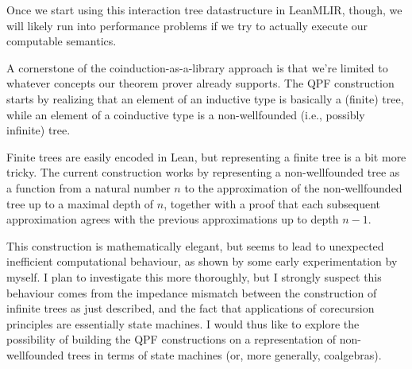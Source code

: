 \documentclass[a4paper]{scrartcl}
\begin{document}
Once we start using this interaction tree datastructure in LeanMLIR, though, 
we will likely run into performance problems if we try to actually execute our computable semantics.

A cornerstone of the coinduction-as-a-library approach is that we're
limited to whatever concepts our theorem prover already supports. The
QPF construction starts by realizing that an element of an inductive
type is basically a (finite) tree, while an element of a coinductive
type is a non-wellfounded (i.e., possibly infinite) tree.

Finite trees are easily encoded in Lean, but representing a finite tree
is a bit more tricky. The current construction works by representing a
non-wellfounded tree as a function from a natural number \(n\) to the
approximation of the non-wellfounded tree up to a maximal depth of
\(n\), together with a proof that each subsequent approximation agrees
with the previous approximations up to depth \(n-1\).

This construction is mathematically elegant, but seems to lead to
unexpected inefficient computational behaviour, as shown by some early
experimentation by myself. I plan to investigate this more thoroughly,
but I strongly suspect this behaviour comes from the impedance mismatch
between the construction of infinite trees as just described, and the
fact that applications of corecursion principles are essentially state
machines. I would thus like to explore the possibility of building the
QPF constructions on a representation of non-wellfounded trees in terms
of state machines (or, more generally, coalgebras).





% 


% 












\end{document}
